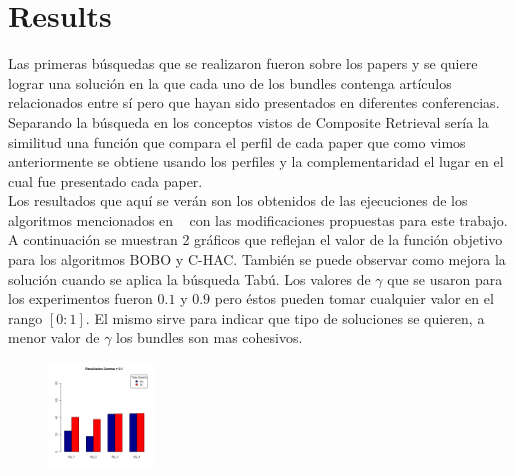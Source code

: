 \section{Results}
Las primeras búsquedas que se realizaron fueron sobre los papers y se quiere lograr una solución en la que cada uno de los bundles contenga artículos relacionados entre sí pero que hayan sido presentados en diferentes conferencias. Separando la búsqueda en los conceptos vistos de Composite Retrieval sería la similitud una función que compara el perfil de cada paper que como vimos anteriormente se obtiene usando los perfiles y la complementaridad el lugar en el cual fue presentado cada paper.\\
Los resultados que aquí se verán son los obtenidos de las ejecuciones de los algoritmos mencionados en ~\cite{compositeRetrival} con las modificaciones propuestas para este trabajo. A continuación se muestran 2 gráficos que reflejan el valor de la función objetivo para los algoritmos BOBO y C-HAC. También se puede observar como mejora la solución cuando se aplica la búsqueda Tabú. Los valores de $\gamma$ que se usaron para los experimentos fueron $0.1$ y $0.9$ pero éstos pueden tomar cualquier valor en el rango $[0:1]$. El mismo sirve para indicar que tipo de soluciones se quieren, a menor valor de $\gamma$ los bundles son mas cohesivos.
\begin{figure}[H]
	\centering
	\includegraphics[width=0.25\textwidth]{img/gamma01.png}
	\caption{}
	\label{res:img-gamma01-papers}
\end{figure}

